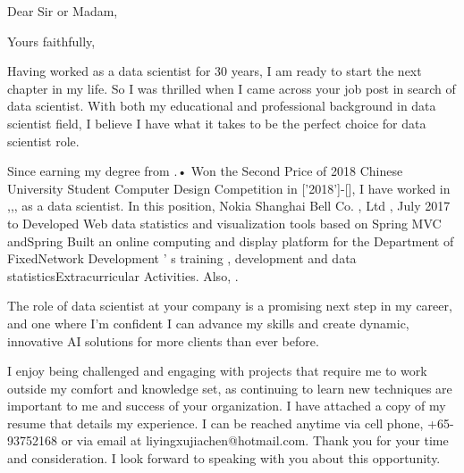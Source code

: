 \documentclass[11pt,a4paper,sans]{moderncv}        %
\begin{document}
\recipient{\quad}{\quad}
\date{March 09 2020}
\opening{Dear Sir or Madam,}
\closing{Yours faithfully,}
\makelettertitle


Having worked as a data scientist for 30 years, I am ready to start the next chapter in my life. So I was thrilled when I came across your job post in search of data scientist. With both my educational and professional background in data scientist field, I believe I have what it takes to be the perfect choice for data scientist role.



Since earning my degree from .• Won the Second Price of 2018 Chinese University Student Computer Design Competition in ['2018']-[], I have worked in ,,, as a data scientist. In this position, Nokia Shanghai Bell Co. , Ltd , July 2017 to Developed Web data statistics and visualization tools based on Spring MVC andSpring Built an online computing and display platform for the Department of FixedNetwork Development ’ s training , development and data statisticsExtracurricular Activities. Also, . 

The role of data scientist at your company is a promising next step in my career, and one where I’m confident I can advance my skills and create dynamic, innovative AI solutions for more clients than ever before.

I enjoy being challenged and engaging with projects that require me to work outside my comfort and knowledge set, as continuing to learn new techniques are important to me and success of your organization.
I have attached a copy of my resume that details my experience. I can be reached anytime via cell phone, +65-93752168 or via email at liyingxujiachen@hotmail.com.
Thank you for your time and consideration. I look forward to speaking with you about this opportunity.


\makeletterclosing
\end{document}
